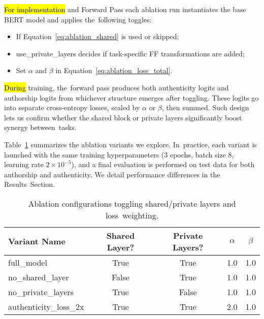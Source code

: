 \documentclass[electronics,article,accept,pdftex,moreauthors,electronics]{Definitions/mdpi}
\begin{document}
\hl{For implementation} %
 and Forward Pass each ablation run instantiates the base BERT model and applies the~following toggles: 
\begin{itemize}
    \item  If Equation~\eqref{eq:ablation_shared} is used or skipped;
    \item use\_private\_layers decides if task-specific FF transformations are added; 
    \item  Set \(\alpha\) and \(\beta\) in Equation~\eqref{eq:ablation_loss_total}.
\end{itemize}

\hl{During} %
 training, the~forward pass produces both authenticity logits and authorship logits from whichever structure emerges after toggling. 
These logits go into separate cross-entropy losses, scaled by \(\alpha\) or \(\beta\), then summed. 
Such design lets us confirm whether the shared block or private layers significantly boost synergy between~tasks.

Table~\ref{tab:ablation_variants} summarizes the ablation variants we explore. In~practice, 
each variant is launched with the same training hyperparameters (3 epochs, batch size 8, 
learning rate $2\times 10^{-5}$), and a final evaluation is performed on test data for both authorship 
and authenticity. We detail performance differences in the Results~Section.


\begin{table}[H]
\tablesize{\small}
\caption{Ablation configurations toggling shared/private layers and loss~weighting.}
\label{tab:ablation_variants}
\setlength{\tabcolsep}{15pt}
\begin{tabularx}{\linewidth}{lcccc}
\toprule
\textbf{Variant Name} & \textbf{Shared Layer?} & \textbf{Private Layers?} & \boldmath$\alpha$ & \boldmath$\beta$ \\
\midrule
full\_model          & True  & True  & 1.0 & 1.0 \\
no\_shared\_layer    & False & True  & 1.0 & 1.0 \\
no\_private\_layers  & True  & False & 1.0 & 1.0 \\
authenticity\_loss\_2x & True  & True  & 2.0 & 1.0 \\
\bottomrule
\end{tabularx}
\end{table}
\end{document}
